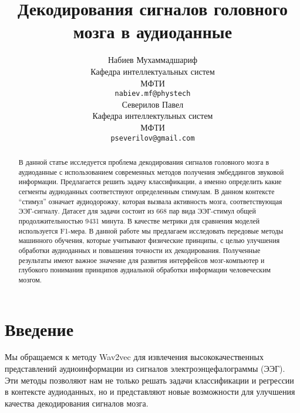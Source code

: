 \documentclass{article}
\title{Декодирования сигналов головного мозга в аудиоданные}
\author{ Набиев Мухаммадшариф \\
        Кафедра интеллектуальных систем\\
	МФТИ\\
	\texttt{nabiev.mf@phystech} \\
	\And
	Северилов Павел \\
	Кафедра интеллектульных систем\\
	МФТИ\\
	\texttt{pseverilov@gmail.com} \\
}
\date{}
\begin{document}
\maketitle

\begin{abstract}
   В данной статье исследуется проблема декодирования сигналов головного мозга в аудиоданные с использованием современных методов получения эмбеддингов звуковой информации. Предлагается решить задачу классификации, а именно определить какие сегменты аудиоданных соответствуют определенным стимулам. В данном контексте “стимул” означает аудиодорожку, которая вызвала активность мозга, соответствующая ЭЭГ-сигналу. Датасет для задачи состоит из 668 пар вида ЭЭГ-стимул общей продолжительностью 9431 минута. В качестве метрики для сравнения моделей используется F1-мера. В данной работе мы предлагаем исследовать передовые методы машинного обучения, которые учитывают физические принципы, с целью улучшения обработки аудиоданных и повышения точности их декодирования. Полученные результаты имеют важное значение для развития интерфейсов мозг-компьютер и глубокого понимания принципов аудиальной обработки информации человеческим мозгом.

\end{abstract}



\section{Введение}
  Мы обращаемся к методу Wav2vec для извлечения высококачественных представлений аудиоинформации из сигналов электроэнцефалограммы (ЭЭГ). Эти методы позволяют нам не только решать задачи классификации и регрессии в контексте аудиоданных, но и представляют новые возможности для улучшения качества декодирования сигналов мозга. 




\end{document}
